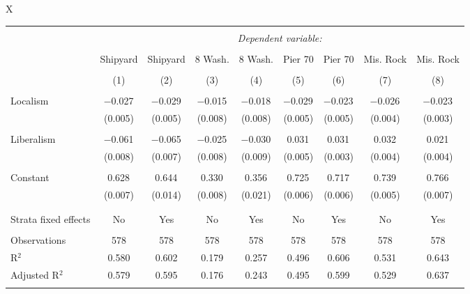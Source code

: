 \documentclass[article,12pt]{memoir}
\begin{document}
\begin{SingleSpacing}
\begin{landscape}
\begin{table}
\begin{threeparttable}
\begin{tabularx}{\linewidth}{X}
\begin{tabular}{@{\extracolsep{5pt}}lcccccccc} 
\\[-1.8ex]\hline 
\hline \\[-1.8ex] 
 & \multicolumn{8}{c}{\textit{Dependent variable:}} \\ 
\cline{2-9} 
\\[-1.8ex] & Shipyard & Shipyard & 8 Wash. & 8 Wash. & Pier 70 & Pier 70 & Mis. Rock & Mis. Rock\\ 
\\[-1.8ex] & (1) & (2) & (3) & (4) & (5) & (6) & (7) & (8)\\ 
\hline \\[-1.8ex] 
 Localism & $-$0.027$^{}$ & $-$0.029$^{}$ & $-$0.015$^{}$ & $-$0.018$^{}$ & $-$0.029$^{}$ & $-$0.023$^{}$ & $-$0.026$^{}$ & $-$0.023$^{}$ \\ 
  & (0.005) & (0.005) & (0.008) & (0.008) & (0.005) & (0.005) & (0.004) & (0.003) \\ 
  & & & & & & & & \\ 
 Liberalism & $-$0.061$^{}$ & $-$0.065$^{}$ & $-$0.025$^{}$ & $-$0.030$^{}$ & 0.031$^{}$ & 0.031$^{}$ & 0.032$^{}$ & 0.021$^{}$ \\ 
  & (0.008) & (0.007) & (0.008) & (0.009) & (0.005) & (0.003) & (0.004) & (0.004) \\ 
  & & & & & & & & \\ 
 Constant & 0.628$^{}$ & 0.644$^{}$ & 0.330$^{}$ & 0.356$^{}$ & 0.725$^{}$ & 0.717$^{}$ & 0.739$^{}$ & 0.766$^{}$ \\ 
  & (0.007) & (0.014) & (0.008) & (0.021) & (0.006) & (0.006) & (0.005) & (0.007) \\ 
  & & & & & & & & \\ 
\hline \\[-1.8ex] 
Strata fixed effects & No & Yes & No & Yes & No & Yes & No & Yes \\ 
\hline \\[-1.8ex] 
Observations & 578 & 578 & 578 & 578 & 578 & 578 & 578 & 578 \\ 
R$^{2}$ & 0.580 & 0.602 & 0.179 & 0.257 & 0.496 & 0.606 & 0.531 & 0.643 \\ 
Adjusted R$^{2}$ & 0.579 & 0.595 & 0.176 & 0.243 & 0.495 & 0.599 & 0.529 & 0.637 \\ 
\hline 
\hline \\[-1.8ex] 
\end{tabular}


\end{tabularx}
\end{threeparttable}
\end{table}
\end{landscape}
\end{SingleSpacing}
\end{document}
